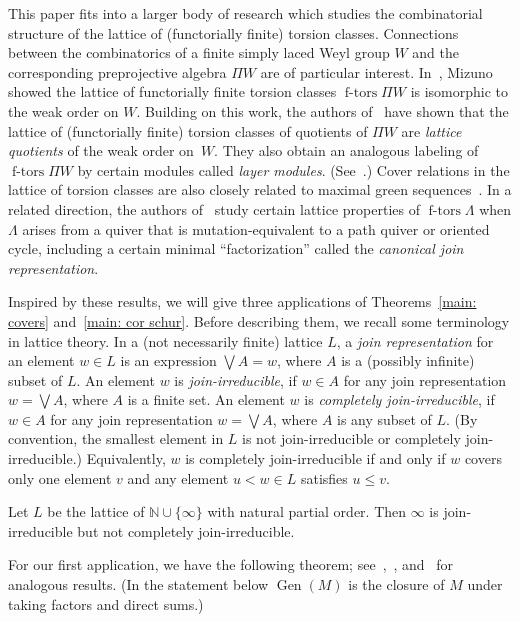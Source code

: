 \documentclass[ALCO,ThmDefs,Unicode,epreuves]{cedram}
\renewcommand{\Join}{\bigvee}
\newcommand{\Gen}{\operatorname{Gen}}
\newcommand{\ftors}{\operatorname{f-tors}}
\renewcommand{\1}{\hat{1}}
\newcommand{\0}{\hat{0}}
\newcommand{\newword}[1]{\emph{#1}}
\begin{document}
This paper fits into a larger body of research which studies the combinatorial structure of the lattice of (functorially finite) torsion classes.
Connections between the combinatorics of a finite simply laced Weyl group $W$ and the corresponding preprojective algebra $\Pi W$ are of particular interest.
In~\cite{Miz}, Mizuno showed the lattice of functorially finite torsion classes $\ftors \Pi W$ is isomorphic to the weak order on $W$.
Building on this work, the authors of~\cite{IRRT} have shown that the lattice of (functorially finite) torsion classes of quotients of $\Pi W$ are \emph{lattice quotients} of the weak order on~$W$.
They also obtain an analogous labeling of $\ftors \Pi W$ by certain modules called \emph{layer modules}.
(See~\cite[Theorem~1.3]{IRRT}.)
Cover relations in the lattice of torsion classes are also closely related to maximal green sequences~\cite{BST}.
In a related direction, the authors of~\cite{G-M} study certain lattice properties of $\ftors \Lambda$ when $\Lambda$ arises from a quiver that is mutation-equivalent to a path quiver or oriented cycle, including a certain minimal ``factorization'' called the \emph{canonical join representation}.

Inspired by these results, we will give three applications of Theorems~\ref{main: covers} and~\ref{main: cor schur}.
Before describing them, we recall some terminology in lattice theory.
In a (not necessarily finite) lattice $L$, a \newword{join representation} for an element $w\in L$ is an expression $\Join A = w$, where $A$ is a (possibly infinite) subset of $L$.
An element $w$ is \newword{join-irreducible}, if $w\in A$ for any join representation $w=\Join A$, where $A$ is a finite set.
An element $w$ is \newword{completely join-irreducible}, if $w\in A$ for any join representation $w=\Join A$, where $A$ is any subset of $L$.
(By convention, the smallest element in $L$ is not join-irreducible or completely join-irreducible.)
Equivalently, $w$ is completely join-irreducible if and only if $w$ covers only one element $v$ and any element $u<w\in L$ satisfies $u\leq v$.
\begin{example}\label{natural numbers}
\normalfont
Let $L$ be the lattice of $\mathbb{N}\cup \{\infty\}$ with natural partial order. Then $\infty$ is join-irreducible but not completely join-irreducible.
\end{example}

For our first application, we have the following theorem; see~\cite[Lemma~8.2]{G-M},~\cite[Theorems~1.1 and 1.2]{IRRT}, and~\cite[Theorem~3.3]{DIRRT} for analogous results.
(In the statement below $\Gen(M)$ is the closure of $M$ under taking factors and direct sums.)
\end{document}
